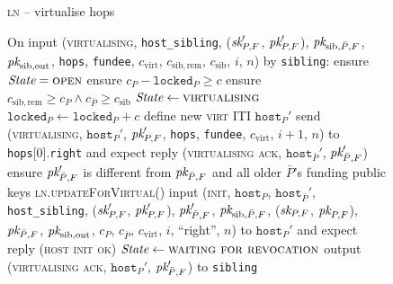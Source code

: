 \begin{figure}[H]
\begin{processbox}{\textsc{ln} -- virtualise hops}
\begin{algorithmic}[1]
      \State On input (\textsc{virtualising}, \texttt{host\_sibling}, ($\textit{sk}_{P,
      F}'$, $\textit{pk}_{P, F}'$), $\textit{pk}_{\mathrm{sib}, \bar{P}, F}$, $\textit{pk}_{\mathrm{sib},
      \mathrm{out}}$, \texttt{hops}, \texttt{fundee}, $c_{\mathrm{virt}}$,
      $c_{\mathrm{sib}, \mathrm{rem}}$, $c_{\mathrm{sib}}$, $i$, $n$) by
      \texttt{sibling}:
      \Indent
        \State ensure $\itistate = \textsc{open}$
        \State ensure $c_P - \texttt{locked}_P \geq c$
        \State ensure $c_{\mathrm{sib}, \mathrm{rem}} \geq c_P \wedge
        c_{\bar{P}} \geq c_{\mathrm{sib}}$ 
        \State $\itistate \gets \textsc{virtualising}$
        \State $\texttt{locked}_P \gets \texttt{locked}_P + c$
        \State define new \textsc{virt} ITI $\texttt{host}_P'$
        \State send (\textsc{virtualising}, $\texttt{host}_P'$, $\textit{pk}_{P, F}'$,
        \texttt{hops}, \texttt{fundee}, $c_{\mathrm{virt}}$, $i+1$, $n$) to
        \texttt{hops}[0].\texttt{right} and expect reply (\textsc{virtualising
        ack}, $\texttt{host}_{\bar{P}}'$, $\textit{pk}_{\bar{P}, F}'$)
        \State ensure $\textit{pk}_{\bar{P}, F}'$ is different from $\textit{pk}_{\bar{P}, F}$ and
        all older $\bar{P}$'s funding public keys
        \State \textsc{ln}.\textsc{updateForVirtual}()
        \State input (\textsc{init}, $\texttt{host}_P$,
        $\texttt{host}_{\bar{P}}'$, \texttt{host\_sibling}, ($\textit{sk}_{P, F}'$,
        $\textit{pk}_{P, F}'$), $\textit{pk}_{\bar{P}, F}'$, $\textit{pk}_{\mathrm{sib}, \bar{P}, F}$,
        ($\textit{sk}_{P, F}$, $\textit{pk}_{P, F}$), $\textit{pk}_{\bar{P}, F}$, $\textit{pk}_{\mathrm{sib},
        \mathrm{out}}$, $c_P$, $c_{\bar{P}}$, $c_{\mathrm{virt}}$, $i$,
        ``right'', $n$) to $\texttt{host}_P'$ and expect reply (\textsc{host
        init ok})
        \State $\itistate \gets \textsc{waiting for revocation}$
        \State output (\textsc{virtualising ack}, $\texttt{host}_P'$,
        $\textit{pk}_{\bar{P}, F}'$) to \texttt{sibling}
      \EndIndent
    \end{algorithmic}
  \end{processbox}
  \caption{}
  \label{code:ln:open:virtualise:hops}
\end{figure}


